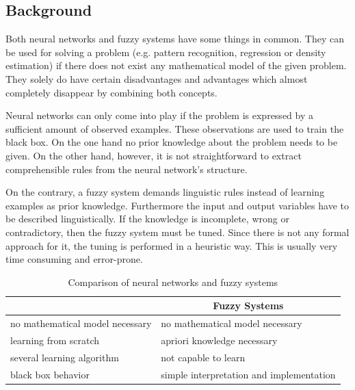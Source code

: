 \subsection{Background}
Both neural networks and fuzzy systems have some things in common. They can be used for solving a problem (e.g. pattern recognition, regression or density estimation) if there does not exist any mathematical model of the given problem. They solely do have certain disadvantages and advantages which almost completely disappear by combining both concepts.

Neural networks can only come into play if the problem is expressed by a sufficient amount of observed examples. These observations are used to train the black box. On the one hand no prior knowledge about the problem needs to be given. On the other hand, however, it is not straightforward to extract comprehensible rules from the neural network's structure.

On the contrary, a fuzzy system demands linguistic rules instead of learning examples as prior knowledge. Furthermore the input and output variables have to be described linguistically. If the knowledge is incomplete, wrong or contradictory, then the fuzzy system must be tuned. Since there is not any formal approach for it, the tuning is performed in a heuristic way. This is usually very time consuming and error-prone.

\begin{table}[h]
\centering
    \begin{tabular}{ | l | l | }
	    \hline
	    \rowcolor{gray!20}
		\multicolumn{1}{|c|}{\textbf{Neural Networks}} & \multicolumn{1}{|c|}{\textbf{Fuzzy Systems}} \\ \hline %
	    no mathematical model necessary & no mathematical model necessary\\ \hline
	    learning from scratch & apriori knowledge necessary \\ \hline
	    several learning algorithm & not capable to learn \\ \hline
	    black box behavior & simple interpretation and implementation \\ \hline
    \end{tabular}
    \caption{Comparison of neural networks and fuzzy systems}
    \label{tab:comparison_neur_ann}
\end{table}

